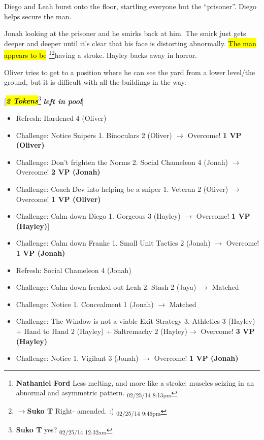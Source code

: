 Diego and Leah burst onto the floor, startling everyone but the ``prisoner''.  Diego helps secure the man.



Jonah looking at the prisoner and he smirks back at him.  The smirk just gets deeper and deeper until it's clear that his face is distorting abnormally.  \hl{The man appears to be }\footnote{\textbf{Nathaniel Ford }Less melting, and more like a stroke: muscles seizing in an abnormal and asymmetric pattern. \textsubscript{02/25/14 8:13pm}}\footnote{$\rightarrow$\textbf{Suko T }Right- amended. :) \textsubscript{02/25/14 9:46pm}}having a stroke.  Hayley backs away in horror.



Oliver tries to get to a position where he can see the yard from a lower level/the ground, but it is difficult with all the buildings in the way.



{[}\textit{\textbf{\hl{2 Tokens}}}\footnote{\textbf{Suko T }yes? \textsubscript{02/25/14 12:32am}}\textit{\textbf{ left in pool}}{]}








\begin{itemize}
\item Refresh: Hardened 4 (Oliver)
\item Challenge: Notice Snipers 1. Binoculars 2 (Oliver) $\rightarrow$ Overcome! \textbf{1 VP (Oliver)}
\item Challenge: Don't frighten the Norms 2.  Social Chameleon 4 (Jonah) $\rightarrow$ Overcome! \textbf{2 VP (Jonah)}
\item Challenge: Coach Dev into helping be a sniper 1. Veteran 2 (Oliver) $\rightarrow$ Overcome! \textbf{1 VP (Oliver)}
\item Challenge: Calm down Diego 1. Gorgeous 3 (Hayley) $\rightarrow$ Overcome! \textbf{1 VP (Hayley)}{]} 
\item Challenge: Calm down Franke 1. Small Unit Tactics 2 (Jonah) $\rightarrow$ Overcome! \textbf{1 VP (Jonah)}
\item Refresh: Social Chameleon 4 (Jonah)
\item Challenge: Calm down freaked out Leah 2. Stash 2 (Jaya) $\rightarrow$  Matched
\item Challenge: Notice 1. Concealment 1 (Jonah) $\rightarrow$ Matched
\item Challenge: The Window is not a viable Exit Strategy 3. Athletics 3 (Hayley) + Hand to Hand 2 (Hayley) + Saltremachy 2 (Hayley)$\rightarrow$ Overcome! \textbf{3 VP (Hayley)}
\item Challenge: Notice 1. Vigilant 3 (Jonah)  $\rightarrow$ Overcome! \textbf{1 VP (Jonah)}
\end{itemize}





